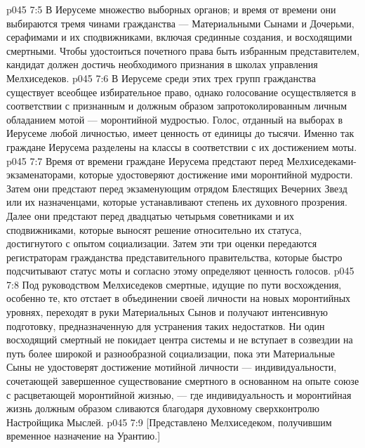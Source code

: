 \vs p045 7:5 \pc В Иерусеме множество выборных органов; и время от времени они выбираются тремя чинами гражданства --- Материальными Сынами и Дочерьми, серафимами и их сподвижниками, включая срединные создания, и восходящими смертными. Чтобы удостоиться почетного права быть избранным представителем, кандидат должен достичь необходимого признания в школах управления Мелхиседеков.
\vs p045 7:6 В Иерусеме среди этих трех групп гражданства существует всеобщее избирательное право, однако голосование осуществляется в соответствии с признанным и должным образом запротоколированным личным обладанием мотой --- моронтийной мудростью. Голос, отданный на выборах в Иерусеме любой личностью, имеет ценность от единицы до тысячи. Именно так граждане Иерусема разделены на классы в соответствии с их достижением моты.
\vs p045 7:7 Время от времени граждане Иерусема предстают перед Мелхиседеками\hyp{}экзаменаторами, которые удостоверяют достижение ими моронтийной мудрости. Затем они предстают перед экзаменующим отрядом Блестящих Вечерних Звезд или их назначенцами, которые устанавливают степень их духовного прозрения. Далее они предстают перед двадцатью четырьмя советниками и их сподвижниками, которые выносят решение относительно их статуса, достигнутого с опытом социализации. Затем эти три оценки передаются регистраторам гражданства представительного правительства, которые быстро подсчитывают статус моты и согласно этому определяют ценность голосов.
\vs p045 7:8 \pc Под руководством Мелхиседеков смертные, идущие по пути восхождения, особенно те, кто отстает в объединении своей личности на новых моронтийных уровнях, переходят в руки Материальных Сынов и получают интенсивную подготовку, предназначенную для устранения таких недостатков. Ни один восходящий смертный не покидает центра системы и не вступает в созвездии на путь более широкой и разнообразной социализации, пока эти Материальные Сыны не удостоверят достижение мотийной личности --- индивидуальности, сочетающей завершенное существование смертного в основанном на опыте союзе с расцветающей моронтийной жизнью, --- где индивидуальность и моронтийная жизнь должным образом сливаются благодаря духовному сверхконтролю Настройщика Мыслей.
\vsetoff
\vs p045 7:9 [Представлено Мелхиседеком, получившим временное назначение на Урантию.]
